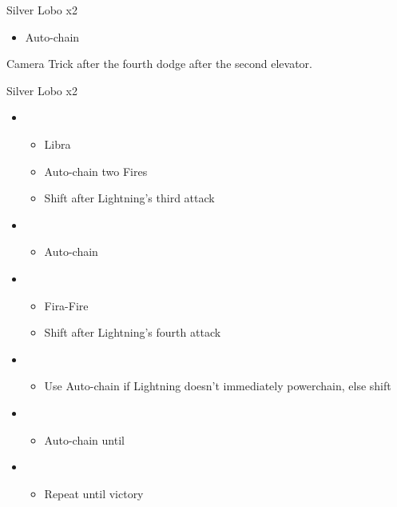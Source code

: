 \begin{paracol}{2}
\begin{battle}{Silver Lobo x2}
\begin{itemize}
\begin{itemize}
				      \item Auto-chain
			      \end{itemize}
		\end{itemize}
	\end{battle}
	\switchcolumn
	Camera Trick after the fourth dodge after the second elevator.
	\begin{battle}{Silver Lobo x2}
		\begin{itemize}
			\item \first
			      \begin{itemize}
				      \item Libra
				      \item Auto-chain two Fires
				      \item Shift after Lightning's third attack
			      \end{itemize}
			\item \fourth
			      \begin{itemize}
				      \item Auto-chain
			      \end{itemize}
			\item \sixth
			      \begin{itemize}
				      \item Fira-Fire
				      \item Shift after Lightning's fourth attack
			      \end{itemize}
			\item \first
			      \begin{itemize}
				      \item Use Auto-chain if Lightning doesn't immediately powerchain, else shift
			      \end{itemize}
			\item \fourth
			      \begin{itemize}
				      \item Auto-chain until \stagger
			      \end{itemize}
			\item \sixth
			      \begin{itemize}
				      \item Repeat until victory
			      \end{itemize}
		\end{itemize}
	\end{battle}
	\switchcolumn*


\end{paracol}
